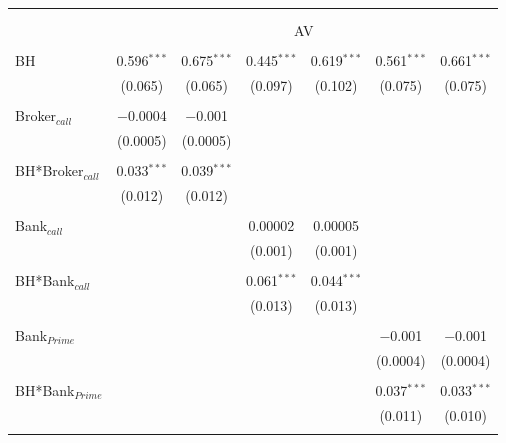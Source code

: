 
\begin{tabular}{@{\extracolsep{5pt}}lcccccc} 
\\[-1.8ex]\hline 
\hline \\[-1.8ex] 
\\[-1.8ex] & \multicolumn{6}{c}{AV} \\ 
\hline \\[-1.8ex] 
 BH & 0.596$^{***}$ & 0.675$^{***}$ & 0.445$^{***}$ & 0.619$^{***}$ & 0.561$^{***}$ & 0.661$^{***}$ \\ 
  & (0.065) & (0.065) & (0.097) & (0.102) & (0.075) & (0.075) \\ 
  & & & & & & \\ 
 Broker$_{call}$ & $-$0.0004 & $-$0.001 &  &  &  &  \\ 
  & (0.0005) & (0.0005) &  &  &  &  \\ 
  & & & & & & \\ 
   BH*Broker$_{call}$ & 0.033$^{***}$ & 0.039$^{***}$ &  &  &  &  \\ 
   & (0.012) & (0.012) &  &  &  &  \\ 
   & & & & & & \\ 
 Bank$_{call}$ &  &  & 0.00002 & 0.00005 &  &  \\ 
  &  &  & (0.001) & (0.001) &  &  \\ 
  & & & & & & \\ 
   BH*Bank$_{call}$ &  &  & 0.061$^{***}$ & 0.044$^{***}$ &  &  \\ 
   &  &  & (0.013) & (0.013) &  &  \\ 
   & & & & & & \\ 
 Bank$_{Prime}$ &  &  &  &  & $-$0.001 & $-$0.001 \\ 
  &  &  &  &  & (0.0004) & (0.0004) \\ 
  & & & & & & \\ 
   BH*Bank$_{Prime}$ &  &  &  &  & 0.037$^{***}$ & 0.033$^{***}$ \\ 
   &  &  &  &  & (0.011) & (0.010) \\ 
   & & & & & & \\ 

\end{tabular}
